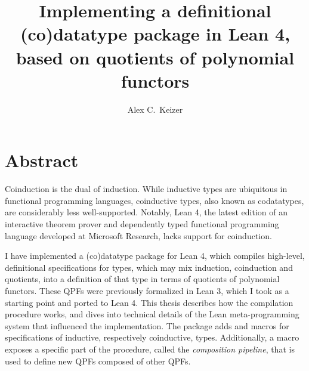 
%
%
\title{Implementing a definitional (co)datatype package in Lean 4, based on quotients of polynomial functors}
\author{Alex C.\ Keizer}
\maketitle


\chapter*{Abstract}
Coinduction is the dual of induction. While inductive types are ubiquitous in functional programming
languages, coinductive types, also known as codatatypes, are considerably less well-supported.
Notably, Lean 4, the latest edition of an interactive theorem prover and dependently typed functional 
programming language developed at Microsoft Research, lacks support for coinduction.

I have implemented a (co)datatype package for Lean 4, which compiles high-level, definitional
specifications for types, which may mix induction, coinduction and quotients, into a definition
of that type in terms of quotients of polynomial functors.
These QPFs were previously formalized in Lean 3, which I took as a starting point and ported to Lean 4.
This thesis describes how the compilation procedure works, and dives into technical details of the Lean
meta-programming system that influenced the implementation.
The package adds \data{} and \codata{} macros for specifications of inductive, respectively coinductive, 
types. Additionally, a \qpf{} macro exposes a specific part of the procedure, called the \emph{composition pipeline},
that is used to define new QPFs composed of other QPFs.


\tableofcontents


\newpage
{}